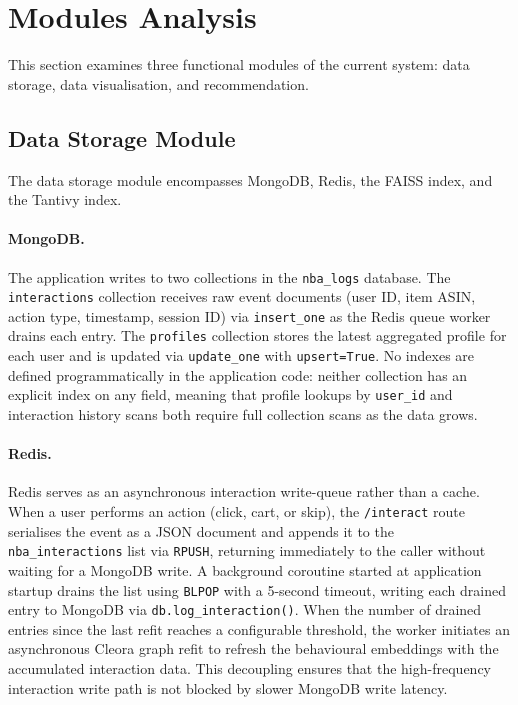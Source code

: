 \section{Modules Analysis}
\label{sec:modules_analysis}

This section examines three functional modules of the current system: data storage, data visualisation, and recommendation.

\subsection{Data Storage Module}
\label{sec:storage_analysis}

The data storage module encompasses MongoDB, Redis, the FAISS index, and the Tantivy index.

\paragraph{MongoDB.}
The application writes to two collections in the \texttt{nba\_logs} database.
The \texttt{interactions} collection receives raw event documents (user ID, item ASIN, action type, timestamp, session ID) via \texttt{insert\_one} as the Redis queue worker drains each entry.
The \texttt{profiles} collection stores the latest aggregated profile for each user and is updated via \texttt{update\_one} with \texttt{upsert=True}.
No indexes are defined programmatically in the application code: neither collection has an explicit index on any field, meaning that profile lookups by \texttt{user\_id} and interaction history scans both require full collection scans as the data grows.

\paragraph{Redis.}
Redis serves as an asynchronous interaction write-queue rather than a cache.
When a user performs an action (click, cart, or skip), the \texttt{/interact} route serialises the event as a JSON document and appends it to the \texttt{nba\_interactions} list via \texttt{RPUSH}, returning immediately to the caller without waiting for a MongoDB write.
A background coroutine started at application startup drains the list using \texttt{BLPOP} with a 5-second timeout, writing each drained entry to MongoDB via \texttt{db.log\_interaction()}.
When the number of drained entries since the last refit reaches a configurable threshold, the worker initiates an asynchronous Cleora graph refit to refresh the behavioural embeddings with the accumulated interaction data.
This decoupling ensures that the high-frequency interaction write path is not blocked by slower MongoDB write latency.

